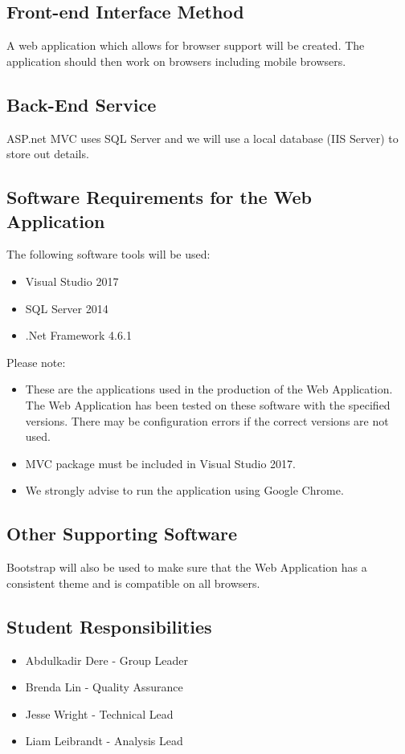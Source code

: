 \documentclass{article}
\begin{document}
\subsection{Front-end Interface Method}
A web application which allows for browser support will be created. The application should then work on  browsers including mobile browsers.
\subsection{Back-End Service}
ASP.net MVC uses SQL Server and we will use a local database (IIS Server) to store out details.
\subsection{Software Requirements for the Web Application}
The following software tools will be used:
\begin{itemize}
\item Visual Studio 2017
\item SQL Server 2014
\item .Net Framework 4.6.1
\end{itemize}
Please note: 
\begin{itemize}
\item These are the applications used in the production of the Web Application. The Web Application has been tested on these software with the specified versions. There may be configuration errors if the correct versions are not used.
\item MVC package must be included in Visual Studio 2017.
\item We strongly advise to run the application using Google Chrome.
\end{itemize}
\subsection{Other Supporting Software}
Bootstrap will also be used to make sure that the Web Application has a consistent theme and is compatible on all browsers. \\
\subsection{Student Responsibilities}
\begin{itemize}
\item Abdulkadir Dere - Group Leader
\item Brenda Lin - Quality Assurance
\item Jesse Wright - Technical Lead
\item Liam Leibrandt - Analysis Lead
\end{itemize}
\end{document}

